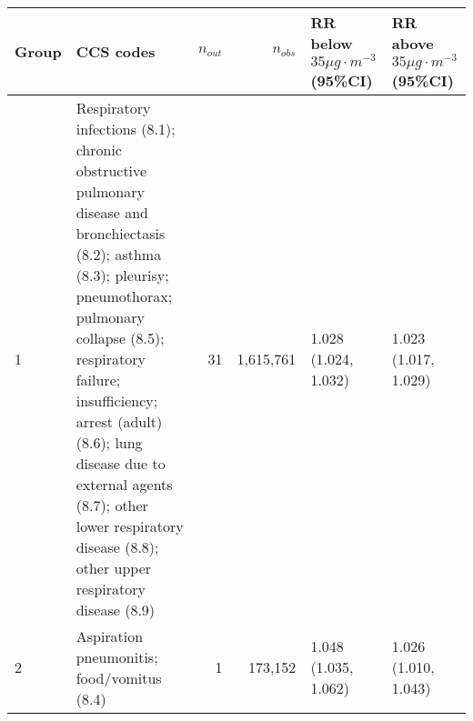 \begin{tabular}{lp{7.6cm}rrp{2.2cm}p{2.2cm}}
  \hline
Group & CCS codes & $n_{out}$ & $n_{obs}$ & RR below $35 \mu g \cdot m^{-3}$ (95\%CI) & RR above $35 \mu g \cdot m^{-3}$ (95\%CI) \\ 
  \hline
   1 & Respiratory infections (8.1); chronic obstructive pulmonary disease and bronchiectasis (8.2); asthma (8.3); pleurisy; pneumothorax; pulmonary collapse (8.5); respiratory failure; insufficiency; arrest (adult) (8.6); lung disease due to external agents (8.7); other lower respiratory disease (8.8); other upper respiratory disease (8.9) &   31 & 1,615,761 & 1.028 (1.024, 1.032) & 1.023 (1.017, 1.029) \\ 
     2 & Aspiration pneumonitis; food/vomitus (8.4) &    1 & 173,152 & 1.048 (1.035, 1.062) & 1.026 (1.010, 1.043) \\ 
   \hline
\end{tabular}

